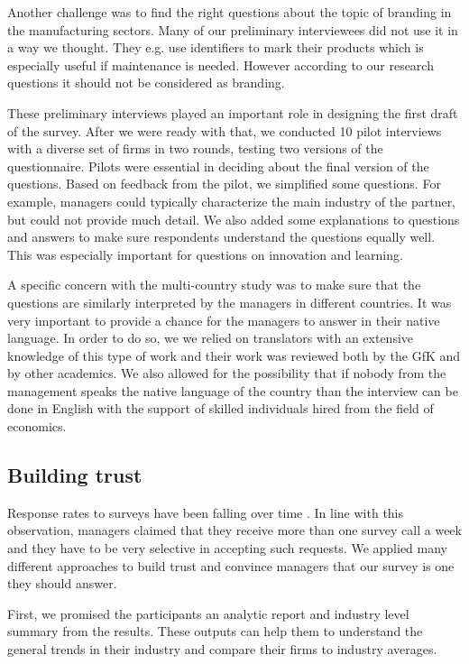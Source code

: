 \documentclass[final, dvipsnames, authoryear,12pt]{elsarticle}
\begin{document}
Another challenge was to find the right questions about the topic of branding in the manufacturing sectors. Many of our preliminary interviewees did not use it in a way we thought. They e.g. use identifiers to mark their products which is especially useful if maintenance is needed. However according to our research questions it should not be considered as branding.

These preliminary interviews played an important role in designing the first draft of the survey. After we were ready with that, we conducted 10 pilot interviews with a diverse set of firms in two rounds, testing two versions of the questionnaire. Pilots were essential in deciding about the final version of the questions. Based on feedback from the pilot, we simplified some questions. For example, managers could typically characterize the main industry of the partner, but could not provide much detail. We also added some explanations to questions and answers to make sure respondents understand the questions equally well. This was especially important for questions on innovation and learning. 

A specific concern with the multi-country study was to make sure that the questions are similarly interpreted by the managers in different countries. It was very important to provide a chance for the managers to answer in their native language. In order to do so, we we relied on translators with an extensive knowledge of this type of work and their work was reviewed both by the GfK and by other academics. We also allowed for the possibility that if nobody from the management speaks the native language of the country than the interview can be done in English with the support of skilled individuals hired from the field of economics.

\subsection{Building trust}
\label{sec:trust}

Response rates to surveys have been falling over time \citep{Bloom2014-hc}. In line with this observation, managers claimed that they receive more than one survey call a week and they have to be very selective in accepting such requests. We applied many different approaches to build trust and convince managers that our survey is one they should answer.

First, we promised the participants an analytic report and industry level summary from the results. These outputs can help them to understand the general trends in their industry and compare their firms to industry averages.
\end{document}
